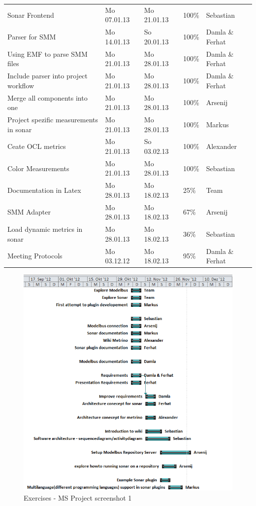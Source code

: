\begin{longtable}{|p{6cm}|p{2.5cm}|p{2.5cm}|p{1.7cm}|p{1.8cm}|}
Sonar Frontend & Mo 07.01.13 & Mo 21.01.13 & 100\% & Sebastian \\ 
Parser for SMM & Mo 14.01.13 & So 20.01.13 & 100\% & Damla \& Ferhat \\ 
Using EMF to parse SMM files & Mo 21.01.13 & Mo 28.01.13 & 100\% & Damla \& Ferhat \\
Include parser into project workflow & Mo 21.01.13 & Mo 28.01.13 & 100\% & Damla \& Ferhat \\ 
Merge all components into one & Mo 21.01.13 & Mo 28.01.13 & 100\% & Arsenij \\ 
Project spezific measurements in sonar & Mo 21.01.13 & Mo 28.01.13 & 100\% & Markus \\ 
Ceate OCL metrics & Mo 21.01.13 & So 03.02.13 & 100\% & Alexander \\ 
Color Measurements & Mo 21.01.13 & Mo 28.01.13 & 100\% & Sebastian \\ 
Documentation in Latex & Mo 28.01.13 & Mo 18.02.13 & 25\% & Team \\ 
SMM Adapter & Mo 28.01.13 & Mo 18.02.13 & 67\% & Arsenij \\ 
Load dynamic metrics in sonar & Mo 28.01.13 & Mo 18.02.13 & 36\% & Sebastian \\ 
Meeting Protocols & Mo 03.12.12 & Mo 18.02.13 & 95\% & Damla \& Ferhat \\
\hline
\end{longtable}

\newpage

\begin{figure}[htb]
\begin{center}
\includegraphics[width=\textwidth]{msp_part1}
\caption{Exercises - MS Project screenshot 1}
\end{center}
\end{figure}

